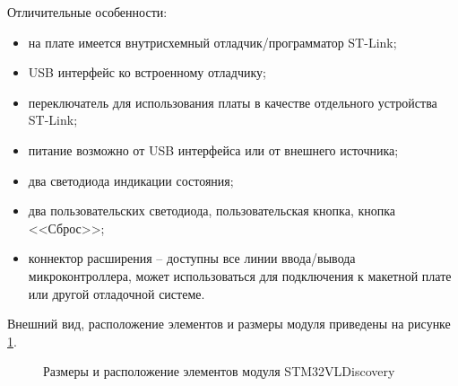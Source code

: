         Отличительные особенности:
        \begin{itemize}
            \item на плате имеется внутрисхемный отладчик/программатор ST-Link;
            \item USB интерфейс ко встроенному отладчику;
            \item переключатель для использования платы в качестве отдельного
                устройства ST-Link;
            \item питание возможно от USB интерфейса или от внешнего источника; 
            \item два светодиода индикации состояния;
            \item два пользовательских светодиода, пользовательская кнопка,
                кнопка \\ <<Сброс>>;
            \item коннектор расширения – доступны все линии ввода/вывода
                микроконтроллера, может использоваться для подключения к
                макетной плате или другой отладочной системе.
        \end{itemize}

        Внешний вид, расположение элементов и размеры модуля приведены на
        рисунке \ref{fig:stm32vldiscovery}.

        \begin{figure}
            \caption{Размеры и расположение элементов модуля STM32VLDiscovery}
            \label{fig:stm32vldiscovery}
        \end{figure}       

